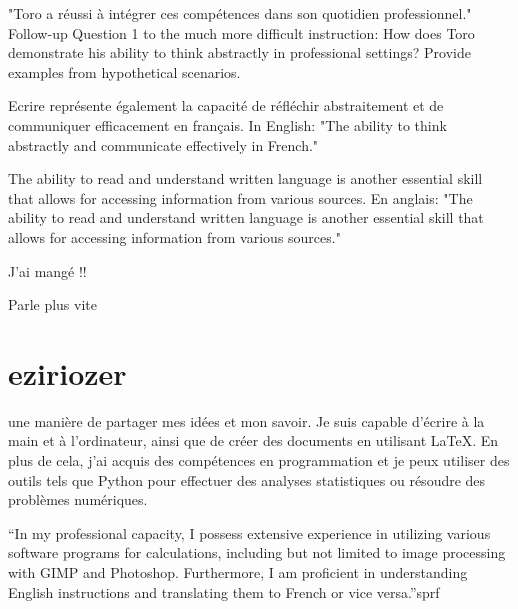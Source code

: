 \documentclass{article}
\begin{document}
"Toro a réussi à intégrer ces compétences dans son quotidien professionnel." Follow-up Question 1 to the much more difficult instruction: How does Toro demonstrate his ability to think abstractly in professional settings? Provide examples from hypothetical scenarios.



Ecrire représente également la capacité de réfléchir abstraitement et de communiquer efficacement en français. In English: "The ability to think abstractly and communicate effectively in French."

The ability to read and understand written language is another essential skill that allows for accessing information from various sources. En anglais: "The ability to read and understand written language is another essential skill that allows for accessing information from various sources."

J'ai mangé !! 

Parle plus vite


\section{eziriozer}

une manière de partager mes idées et mon savoir. Je suis capable d'écrire à la main et à l'ordinateur, ainsi que de créer des documents en utilisant LaTeX. En plus de cela, j'ai acquis des compétences en programmation et je peux utiliser des outils tels que Python pour effectuer des analyses statistiques ou résoudre des problèmes numériques.


 ``In my professional capacity, I possess extensive experience in utilizing various software programs for calculations, including but not limited to image processing with GIMP and Photoshop. Furthermore, I am proficient in understanding English instructions and translating them to French or vice versa.''sprf
\end{document}

